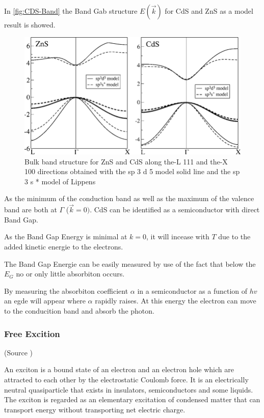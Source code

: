 In \autoref{fig:CDS-Band} the Band Gab structure $E(\vec{k})$ for CdS and ZnS as 
a model result is showed.

\begin{figure}[H]
  \centering
  \includegraphics[width=0.7\linewidth]{Graphics/Chapter3/Bulk-band-structure-for-ZnS-and-CdS-along-the-L-111-and-the-X-100-directions-obtained.png}
  \caption{Bulk band structure for ZnS and CdS along the-L 111 and the-X 100 directions obtained with the sp 3 d 5 
  model solid line and the sp 3 s * model of Lippens \cite{band_gap_CdS}}
  \label{fig:CDS-Band}
\end{figure}

As the minimum of the conduction band as well as the maximum of the valence band are both 
at $\Gamma$ ($\vec{k}= 0)$. CdS can be identified as a semiconductor with
direct Band Gap.

As the Band Gap Energy is minimal at $k=0$, it will incease 
with $T$ due to the added kinetic energie to the electrons.

The Band Gap Energie can be easily measured by use of the fact
that below the $E_G$ no or only little absorbiton occurs.

By measuring the absorbiton coefficient $\alpha$ in a 
semiconductor as a function of $hv$ an egde will appear 
where $\alpha$ rapidly raises. At this energy the electron
can move to the conducition band and absorb the photon.


\subsubsection*{Free Excition}

(Source \cite[Introduction to Solid State Physics p. 312]{kittel})

An exciton is a bound state of an electron and an electron hole which are attracted to each other by the electrostatic Coulomb force. It is an electrically neutral quasiparticle that exists in insulators, semiconductors and some liquids. The exciton is regarded as an elementary excitation of condensed matter that can transport energy without transporting net electric charge.

